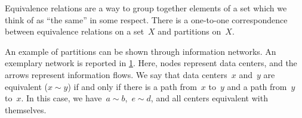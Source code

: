 \begin{remark}
  Equivalence relations are a way to group together elements of a set which we think of as ``the same'' in some respect. There is a one-to-one correspondence between equivalence relations on a set~$X$ and partitions on~$X$.
\end{remark}

\begin{example}
  An example of partitions can be shown through information networks.
  An exemplary network is reported in \cref{fig:info_network}.
  Here, nodes represent data centers, and the arrows represent information flows.
  We say that data centers~$x$ and~$y$ are equivalent ($x\sim y$) if and only if there is a path from~$x$ to~$y$ and a path from~$y$ to~$x$.
  In this case, we have~$a\sim b$,~$e\sim d$, and all centers equivalent with themselves.
\end{example}

\begin{figure}[h!]
  \begin{center}
  \end{center}
  \caption{\label{fig:info_network}}
\end{figure}
